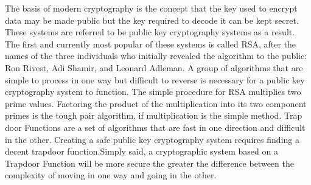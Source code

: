\documentclass{article}
\begin{document}
The basis of modern cryptography is the concept that the key used to encrypt data may be made public but the key required to decode it can be kept secret. These systems are referred to be public key cryptography systems as a result. The first and currently most popular of these systems is called RSA, after the names of the three individuals who initially revealed the algorithm to the public: Ron Rivest, Adi Shamir, and Leonard Adleman.
A group of algorithms that are simple to process in one way but difficult to reverse is necessary for a public key cryptography system to function. The simple procedure for RSA multiplies two prime values. Factoring the product of the multiplication into its two component primes is the tough pair algorithm, if multiplication is the simple method. Trap door Functions are a set of algorithms that are fast in one direction and difficult in the other. Creating a safe public key cryptography system requires finding a decent trapdoor function.Simply said, a cryptographic system based on a Trapdoor Function will be more secure the greater the difference between the complexity of moving in one way and going in the other.
\end{document}
